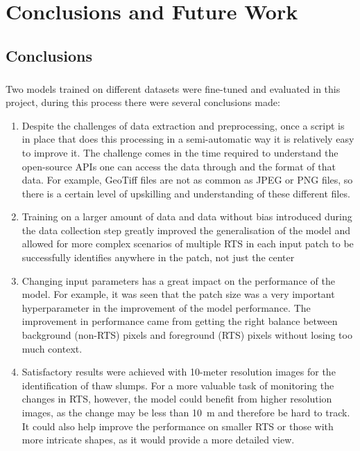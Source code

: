 \chapter{Conclusions and Future Work}
\section{Conclusions}
\paragraph{}
Two models trained on different datasets were fine-tuned and evaluated in this project, during this process there were several conclusions made:
\begin{enumerate}
    \item{Despite the challenges of data extraction and preprocessing, once a script is in place that does this processing in a semi-automatic way it is relatively easy to improve it. The challenge comes in the time required to understand the open-source \gls{API}s one can access the data through and the format of that data. For example, GeoTiff files are not as common as JPEG or PNG files, so there is a certain level of upskilling and understanding of these different files.}
    \item{Training on a larger amount of data and data without bias introduced during the data collection step greatly improved the generalisation of the model and allowed for more complex scenarios of multiple \gls{RTS} in each input patch to be successfully identifies anywhere in the patch, not just the center}
    \item{Changing input parameters has a great impact on the performance of the model. For example, it was seen that the patch size was a very important hyperparameter in the improvement of the model performance. The improvement in performance came from getting the right balance between background (non-\gls{RTS}) pixels and foreground (\gls{RTS}) pixels without losing too much context.}
    \item{Satisfactory results were achieved with 10-meter resolution images for the identification of thaw slumps. For a more valuable task of monitoring the changes in \gls{RTS}, however, the model could benefit from higher resolution images, as the change may be less than \SI{10}{\metre} and therefore be hard to track. It could also help improve the performance on smaller \gls{RTS} or those with more intricate shapes, as it would provide a more detailed view.}

\end{enumerate}
